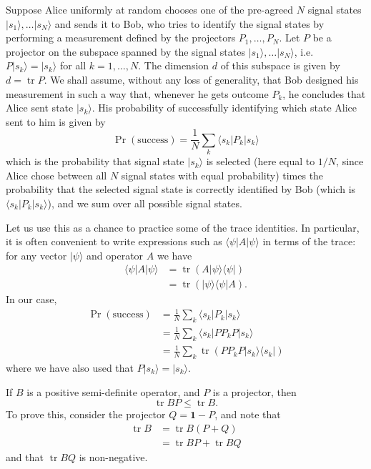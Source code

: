 \documentclass[fleqn]{article}
\newenvironment{idea}{\noindent}{\medskip}
\begin{document}
Suppose Alice uniformly at random chooses one of the pre-agreed \(N\) signal states \(|s_1\rangle,\ldots|s_N\rangle\) and sends it to Bob, who tries to identify the signal states by performing a measurement defined by the projectors \(P_1,\ldots,P_N\).
Let \(P\) be a projector on the subspace spanned by the signal states \(|s_1\rangle,\ldots|s_N\rangle\), i.e.~\(P|s_k\rangle = |s_k\rangle\) for all \(k=1,\ldots,N\).
The dimension \(d\) of this subspace is given by \(d=\operatorname{tr}P\).
We shall assume, without any loss of generality, that Bob designed his measurement in such a way that, whenever he gets outcome \(P_k\), he concludes that Alice sent state \(|s_k\rangle\).
His probability of successfully identifying which state Alice sent to him is given by
\[
  \Pr(\text{success})
  = \frac{1}{N} \sum_k \langle s_k|P_k|s_k\rangle
\]
which is the probability that signal state \(|s_k\rangle\) is selected (here equal to \(1/N\), since Alice chose between all \(N\) signal states with equal probability) times the probability that the selected signal state is correctly identified by Bob (which is \(\langle s_k|P_k|s_k\rangle\)), and we sum over all possible signal states.

Let us use this as a chance to practice some of the trace identities.
In particular, it is often convenient to write expressions such as \(\langle\psi|A|\psi\rangle\) in terms of the trace: for any vector \(|\psi\rangle\) and operator \(A\) we have
\[
  \begin{aligned}
    \langle\psi|A|\psi\rangle
    &= \operatorname{tr}(A|\psi\rangle\langle\psi|)
  \\&= \operatorname{tr}(|\psi\rangle\langle\psi| A).
  \end{aligned}
\]
In our case,
\[
  \begin{aligned}
    \Pr(\text{success})
    &= \frac{1}{N} \sum_k \langle s_k|P_k|s_k\rangle
  \\&= \frac{1}{N} \sum_k \langle s_k|PP_kP|s_k\rangle
  \\&= \frac{1}{N} \sum_k \operatorname{tr}(PP_kP|s_k\rangle\langle s_k|)
  \end{aligned}
\]
where we have also used that \(P|s_k\rangle=|s_k\rangle\).

\begin{idea}
If \(B\) is a positive semi-definite operator, and \(P\) is a projector, then
\[
  \operatorname{tr}BP \leqslant\operatorname{tr}B.
\]
To prove this, consider the projector \(Q=\mathbf{1}-P\), and note that
\[
  \begin{aligned}
    \operatorname{tr}B
    &= \operatorname{tr}B(P+Q)
  \\&= \operatorname{tr}BP + \operatorname{tr}BQ
  \end{aligned}
\]
and that \(\operatorname{tr}BQ\) is non-negative.

\end{idea}
\end{document}
